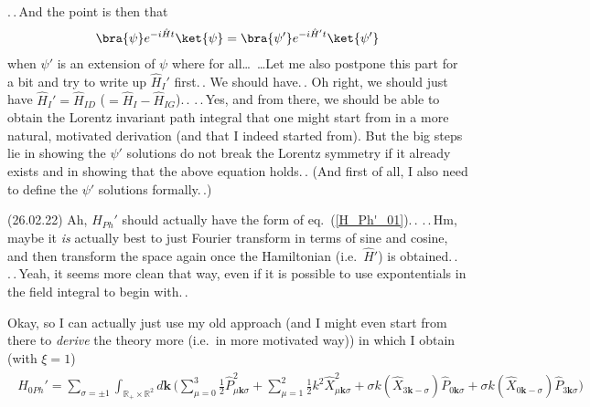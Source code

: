 \documentclass{report}
\begin{document}
.\,.\,And the point is then that
\begin{align}
\begin{aligned}
	\bra{\psi} e^{-i \hat H t} \ket{\psi} = \bra{\psi'} e^{-i \hat H' t} \ket{\psi'}
\end{aligned}
\end{align}
when $\psi'$ is an extension of $\psi$ where for all\ldots\ \ldots Let me also postpone this part for a bit and try to write up $\hat H_I'$ first.\,. We should have.\,. Oh right, we should just have $\hat H_I' = \hat H_{ID}$ ($= \hat H_I - \hat H_{IG}$).\,. .\,.\,Yes, and from there, we should be able to obtain the Lorentz invariant path integral that one might start from in a more natural, motivated derivation (and that I indeed started from). But the big steps lie in showing the $\psi'$ solutions do not break the Lorentz symmetry if it already exists and in showing that the above equation holds.\,. (And first of all, I also need to define the $\psi'$ solutions formally.\,.) %


(26.02.22) Ah, $\hat H_{Ph}'$ should actually have the form of eq.\ (\ref{H_Ph'_01}).\,. .\,.\,Hm, maybe it \emph{is} actually best to just Fourier transform in terms of sine and cosine, and then transform the space again once the Hamiltonian (i.e.\ $\hat H'$) is obtained.\,. .\,.\,Yeah, it seems more clean that way, even if it is possible to use expontentials in the field integral to begin with.\,. 

Okay, so I can actually just use my old approach (and I might even start from there to \emph{derive} the theory more (i.e.\ in more motivated way)) in which I obtain (with $\xi = 1$)
\begin{align}
\begin{aligned}
	\hat H_{0 Ph}' = \sum_{\sigma=\pm 1}\int_{\mathbb{R}_{+}\times \mathbb{R}^{2}} d\boldsymbol{k}\, \Big(
		\sum_{\mu=0}^3 \frac{1}{2} \hat P_{\mu \boldsymbol{k} \sigma}^2 +
		\sum_{\mu=1}^2 \frac{1}{2} k^2 \hat X_{\mu \boldsymbol{k}  \sigma}^2 +
		\sigma k (\hat X_{3 \boldsymbol{k} -\sigma}) \hat P_{0 \boldsymbol{k} \sigma} +
		\sigma k (\hat X_{0\boldsymbol{k} -\sigma}) \hat P_{3 \boldsymbol{k} \sigma}
	\Big)
	\label{H_Ph'_02}
\end{aligned}
\end{align}
\end{document}
